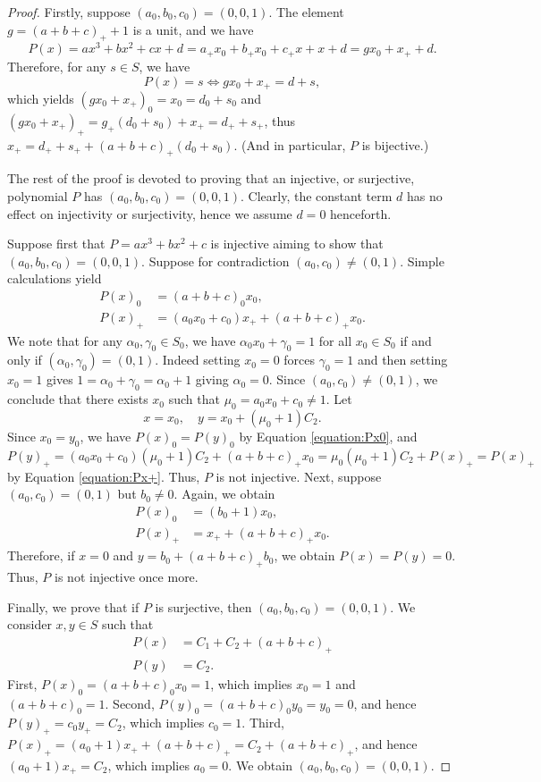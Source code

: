 \documentclass[a4paper, 11pt]{article}
\theoremstyle{plain}
\theoremstyle{definition}
\begin{document}
\begin{proof}
Firstly, suppose $(a_0 , b_0, c_0) = (0,0,1)$. The element $g = (a + b + c)_+ + 1$ is a unit, and we have
\[
    P(x) = a x^3 + b x^2 + c x + d = a_+ x_0 + b_+ x_0 + c_+ x + x + d = g x_0 + x_+ + d.
\]
Therefore, for any $s \in S$, we have
\[
    P(x) = s \iff g x_0 + x_+ = d + s,
\]
which yields $(g x_0 + x_+)_0 = x_0 = d_0 + s_0$ and $(g x_0 + x_+)_+ = g_+ (d_0 + s_0) + x_+ = d_+ + s_+$, thus $x_+ = d_+ + s_+ + (a + b + c)_+ (d_0 + s_0)$. (And in particular, $P$ is bijective.)

The rest of the proof is devoted to proving that an injective, or surjective, polynomial $P$ has $(a_0, b_0, c_0) = (0,0,1)$. Clearly, the constant term $d$ has no effect on injectivity or surjectivity, hence we assume $d = 0$ henceforth.

Suppose first that $P = ax^3+bx^2+c$ is injective aiming to show that $(a_0, b_0, c_0) = (0,0,1)$. Suppose for contradiction $(a_0, c_0) \ne (0,1)$.  Simple calculations yield
\begin{align}
    \label{equation:Px0}
    P(x)_0 &= (a + b + c)_0 x_0, \\
%
    \label{equation:Px+}
    P(x)_+ &= (a_0 x_0 + c_0) x_+ + (a + b + c)_+ x_0.
\end{align}
We note that for any $\alpha_0, \gamma_0 \in S_0$, we have $\alpha_0 x_0 + \gamma_0 = 1$ for all $x_0 \in S_0$ if and only if $(\alpha_0, \gamma_0) = (0,1)$. Indeed setting $x_0 = 0$ forces $\gamma_0 = 1$ and then setting $x_0 = 1$ gives $1 = \alpha_0 + \gamma_0 = \alpha_0 + 1$ giving $\alpha_0 = 0$. Since $(a_0, c_0) \ne (0,1)$, we conclude that there exists $x_0$ such that $\mu_0 = a_0 x_0 + c_0 \ne 1$. Let 
\[
    x = x_0, \quad y = x_0 + (\mu_0 + 1) C_2.
\]
Since $x_0 = y_0$, we have $P(x)_0 = P(y)_0$ by Equation \eqref{equation:Px0}, and 
\[
    P(y)_+ = (a_0 x_0 + c_0) (\mu_0 + 1) C_2 + (a + b + c)_+ x_0 = \mu_0 (\mu_0 + 1) C_2 + P(x)_+ = P(x)_+
\]
by Equation \eqref{equation:Px+}. Thus, $P$ is not injective. Next, suppose $(a_0, c_0) = (0,1)$ but $b_0 \ne 0$. Again, we obtain 
\begin{align*}
    P(x)_0 &= (b_0 + 1) x_0, \\
%
    P(x)_+ &= x_+ + (a + b + c)_+ x_0.
\end{align*}
Therefore, if $x = 0$ and $y = b_0 + (a + b + c)_+ b_0$, we obtain $P(x) = P(y) = 0$. Thus, $P$ is not injective once more.


Finally, we prove that if $P$ is surjective, then $(a_0, b_0, c_0) = (0,0,1)$. We consider $x, y \in S$ such that
\begin{align*}
    P(x) &= C_1 + C_2 + (a + b + c)_+ \\
    P(y) &= C_2.
\end{align*}
First, $P(x)_0 = (a + b + c)_0 x_0 = 1$, which implies $x_0 = 1$ and $(a + b + c)_0 = 1$. Second, $P(y)_0 = ( a + b + c )_0 y_0 = y_0 = 0$, and hence $P(y)_+ = c_0 y_+ = C_2$, which implies $c_0 = 1$. Third, $P(x)_+ = (a_0 + 1) x_+ + (a + b + c)_+ = C_2 + (a + b + c)_+$, and hence $(a_0 + 1)x_+ = C_2$, which implies $a_0 = 0$. We obtain $(a_0, b_0, c_0) = (0,0,1)$.
\end{proof}
\end{document}
